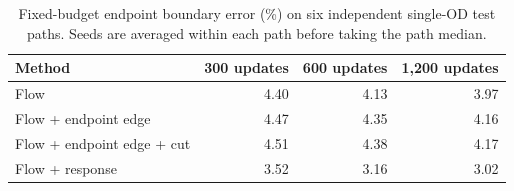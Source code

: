\begin{table}[t]\centering\small
\caption{Fixed-budget endpoint boundary error (\%) on six independent single-OD test paths. Seeds are averaged within each path before taking the path median.}
\label{tab:pair-budget-v102}
\begin{tabular}{lrrr}\toprule Method & 300 updates & 600 updates & 1,200 updates\\\midrule
Flow & 4.40 & 4.13 & 3.97\\
Flow + endpoint edge & 4.47 & 4.35 & 4.16\\
Flow + endpoint edge + cut & 4.51 & 4.38 & 4.17\\
Flow + response & 3.52 & 3.16 & 3.02\\
\bottomrule\end{tabular}\end{table}
